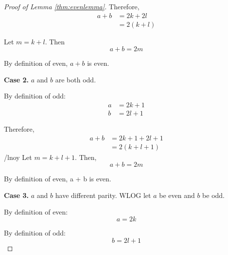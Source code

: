 \documentclass{article}
\numberwithin{subcase}{case}
\begin{document}
\begin{outline}[enumerate]
\begin{proof}[Proof of Lemma \ref{thm:evenlemma}]
            Therefore,
            \begin{equation}
                \begin{aligned}
                    a + b &= 2k + 2l \\
                    &= 2(k + l) 
                \end{aligned}
            \end{equation}

            Let $m = k + l$. Then
            \begin{equation}
                a + b = 2m
            \end{equation}

            By definition of even, $a + b$ is even.  
           
            \textbf{Case 2.} $a$ and $b$ are both odd.

            By definition of odd:
            \begin{equation}
                \begin{aligned}
                    a &= 2k + 1 \\
                    b &= 2l + 1
                \end{aligned}
            \end{equation}

            Therefore, 
            \begin{equation}
                \begin{aligned}
                    a + b &= 2k + 1 + 2l + 1 \\ 
                    &= 2(k + l + 1) 
                \end{aligned}
            \end{equation}
/lnoy
            Let $m = k + l + 1$. Then,
            \begin{equation}
                a + b = 2m
            \end{equation}

            By definition of even, a + b is even.

            \textbf{Case 3.} $a$ and $b$ have different parity. WLOG let $a$ be even and $b$ be odd.

            By definition of even:
            \begin{equation}
                a = 2k
            \end{equation}

            By definition of odd:
            \begin{equation}
                b = 2l + 1
            \end{equation}


\end{proof}
\end{outline}
\end{document}
